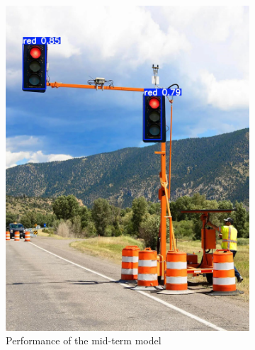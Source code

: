 \documentclass[journal,transmag]{IEEEtran}
\begin{document}
\begin{figure}[h]
    \centering
    \begin{subfigure}[b]{0.225\textwidth}
        \includegraphics[width=\textwidth]{Result_1.png}
        \caption{Performance of the mid-term model}
        \label{fig:Result_1}
    \end{subfigure}
    \hfill
    \begin{subfigure}[b]{0.225\textwidth}

\end{subfigure}
\end{figure}
\end{document}
